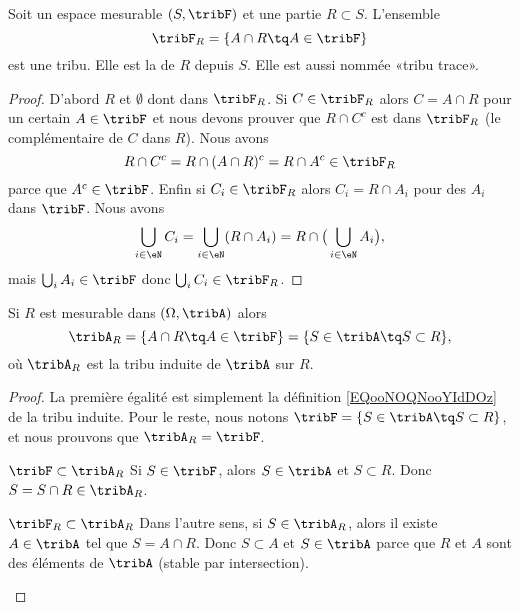 \begin{propositionDef}      \label{DefDHTTooWNoKDP}
	Soit un espace mesurable \( (S,\tribF)  \) et une partie \( R\subset S\). L'ensemble
	\begin{equation}        \label{EQooNOQNooYIdDOz}
		\tribF_R=\{ A\cap R\tq A\in\tribF \}
	\end{equation}
	est une tribu. Elle est la  de \( R\) depuis \( S\). Elle est aussi nommée «tribu trace».
\end{propositionDef}

\begin{proof}
	D'abord \( R\) et \( \emptyset\) dont dans \( \tribF_R\). Si \( C\in\tribF_R \) alors \( C=A\cap R\) pour un certain \( A\in \tribF\) et nous devons prouver que \( R\cap C^c\) est dans \( \tribF_R\) (le complémentaire de \( C\) dans \( R\)). Nous avons
	\begin{equation}
		R\cap C^c=R\cap(A\cap R)^c=R\cap A^c\in \tribF_R
	\end{equation}
	parce que \( A^c\in \tribF\). Enfin si \( C_i\in \tribF_R\) alors \( C_i=R\cap A_i\) pour des \( A_i\) dans \( \tribF\). Nous avons
	\begin{equation}
		\bigcup_{i\in \eN}C_i=\bigcup_{i\in \eN}(R\cap A_i)=R\cap\big( \bigcup_{i\in \eN}A_i \big),
	\end{equation}
	mais \( \bigcup_iA_i \in \tribF\) donc \( \bigcup_iC_i\in \tribF_R\).
\end{proof}

\begin{proposition}     \label{PROPooUNNSooMUQKfp}
	Si \( R\) est mesurable dans \( (\Omega,\tribA)\) alors
	\begin{equation}
		\tribA_R=\{ A\cap R\tq A\in\tribF \}=\{ S\in\tribA\tq S\subset R \},
	\end{equation}
	où \( \tribA_R\) est la tribu induite de \( \tribA\) sur \( R\).
\end{proposition}

\begin{proof}
	La première égalité est simplement la définition \eqref{EQooNOQNooYIdDOz} de la tribu induite.
	Pour le reste, nous notons \( \tribF=\{ S\in \tribA\tq S\subset R \}\), et nous prouvons que \( \tribA_R=\tribF \).

	\begin{subproof}
		\item[\( \tribF\subset\tribA_R\)]
		Si \( S\in \tribF\), alors \( S\in \tribA\) et \( S\subset R\). Donc \( S=S\cap R\in\tribA_R\).

		\item[\( \tribF_R\subset \tribA_R\)]
		Dans l'autre sens, si \( S\in \tribA_R\), alors il existe \( A\in\tribA\) tel que \( S=A\cap R\). Donc \( S\subset A\) et \( S\in\tribA\) parce que \( R\) et \( A\) sont des éléments de \( \tribA\) (stable par intersection).
	\end{subproof}
\end{proof}

